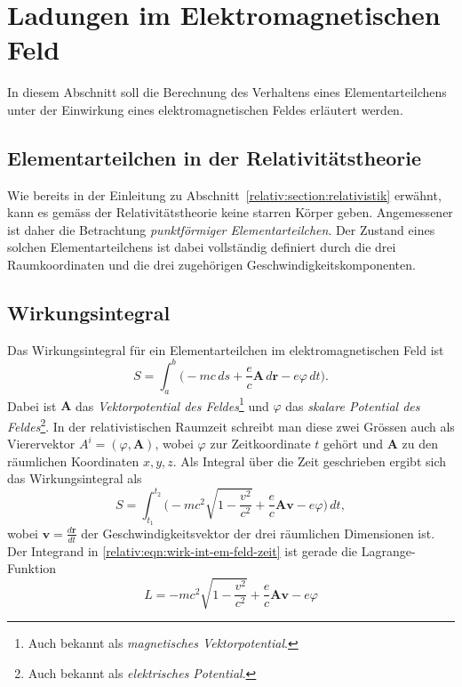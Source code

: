 
\section{Ladungen im Elektromagnetischen Feld
\label{relativ:section:em_feld}}

In diesem Abschnitt soll die Berechnung des Verhaltens eines Elementarteilchens
unter der Einwirkung eines elektromagnetischen Feldes erläutert werden.


\subsection{Elementarteilchen in der Relativitätstheorie
\label{relativ:section:elementarteilchen}}

Wie bereits in der Einleitung zu Abschnitt~\ref{relativ:section:relativistik} erwähnt,
kann es gemäss der Relativitätstheorie keine starren Körper geben.
Angemessener ist daher die Betrachtung \emph{punktförmiger Elementarteilchen}.
Der Zustand eines solchen Elementarteilchens ist dabei vollständig definiert durch
die drei Raumkoordinaten und die drei zugehörigen Geschwindigkeitskomponenten.


\subsection{Wirkungsintegral
\label{relativ:section:wirkungsintegral}}

Das Wirkungsintegral für ein Elementarteilchen im elektromagnetischen Feld ist
\begin{equation}
    S = \int_a^b \biggl(-mc\,ds + \frac{e}{c} \bm{A}\,d\bm{r} - e\varphi\,dt\biggr).
    \label{relativ:eqn:wirk-int-em-feld}
\end{equation}
Dabei ist \(\bm{A}\) das \emph{Vektorpotential des Feldes}\footnote{
    Auch bekannt als \emph{magnetisches Vektorpotential}.}
und \(\varphi\) das \emph{skalare Potential des Feldes}\footnote{
    Auch bekannt als \emph{elektrisches Potential}.}.
In der relativistischen Raumzeit schreibt man diese zwei Grössen
auch als Vierervektor \(A^i = (\varphi, \bm{A})\),
wobei \(\varphi\) zur Zeitkoordinate \(t\) gehört und
\(\bm{A}\) zu den räumlichen Koordinaten \(x, y, z\).
Als Integral über die Zeit geschrieben ergibt sich das Wirkungsintegral als
\begin{equation}
    S = \int_{t_1}^{t_2} \biggl( -mc^2 \sqrt{1-\frac{v^2}{c^2}} + \frac{e}{c} \bm{A} \bm{v} - e \varphi \biggr) \, dt,
    \label{relativ:eqn:wirk-int-em-feld-zeit}
\end{equation}
wobei \(\displaystyle \bm{v} = \frac{d\bm{r}}{dt}\) der Geschwindigkeitsvektor der drei räumlichen Dimensionen ist.
Der Integrand in \eqref{relativ:eqn:wirk-int-em-feld-zeit} ist gerade die Lagrange-Funktion
\begin{equation}
    L = -mc^2 \sqrt{1-\frac{v^2}{c^2}} + \frac{e}{c} \bm{A} \bm{v} - e \varphi
    \label{relativ:eqn:lagrange-em-feld}
\end{equation}


